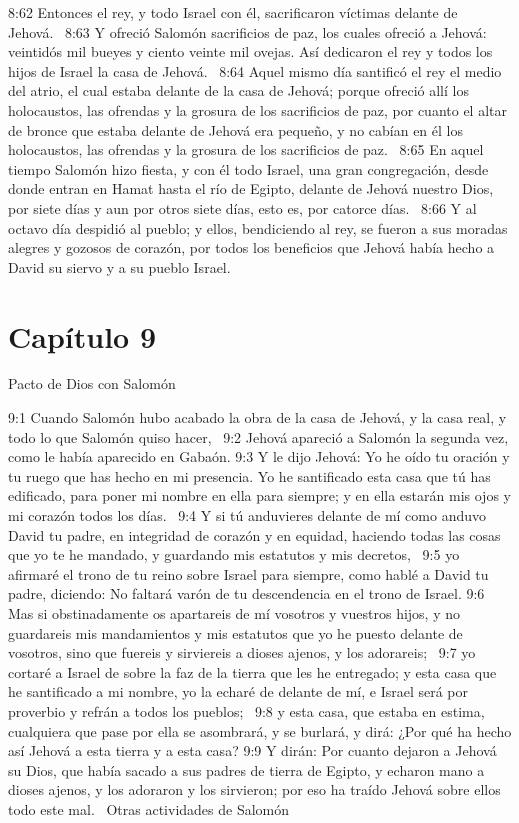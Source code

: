 8:62 Entonces el rey, y todo Israel con él, sacrificaron víctimas delante de Jehová.  
8:63 Y ofreció Salomón sacrificios de paz, los cuales ofreció a Jehová: veintidós mil bueyes y ciento veinte mil ovejas. Así dedicaron el rey y todos los hijos de Israel la casa de Jehová.  
8:64 Aquel mismo día santificó el rey el medio del atrio, el cual estaba delante de la casa de Jehová; porque ofreció allí los holocaustos, las ofrendas y la grosura de los sacrificios de paz, por cuanto el altar de bronce que estaba delante de Jehová era pequeño, y no cabían en él los holocaustos, las ofrendas y la grosura de los sacrificios de paz.  
8:65 En aquel tiempo Salomón hizo fiesta, y con él todo Israel, una gran congregación, desde donde entran en Hamat hasta el río de Egipto, delante de Jehová nuestro Dios, por siete días y aun por otros siete días, esto es, por catorce días.  
8:66 Y al octavo día despidió al pueblo; y ellos, bendiciendo al rey, se fueron a sus moradas alegres y gozosos de corazón, por todos los beneficios que Jehová había hecho a David su siervo y a su pueblo Israel.  
\section*{Capítulo 9 }
Pacto de Dios con Salomón  


9:1 Cuando Salomón hubo acabado la obra de la casa de Jehová, y la casa real, y todo lo que Salomón quiso hacer,  
9:2 Jehová apareció a Salomón la segunda vez, como le había aparecido en Gabaón. 
9:3 Y le dijo Jehová: Yo he oído tu oración y tu ruego que has hecho en mi presencia. Yo he santificado esta casa que tú has edificado, para poner mi nombre en ella para siempre; y en ella estarán mis ojos y mi corazón todos los días.  
9:4 Y si tú anduvieres delante de mí como anduvo David tu padre, en integridad de corazón y en equidad, haciendo todas las cosas que yo te he mandado, y guardando mis estatutos y mis decretos,  
9:5 yo afirmaré el trono de tu reino sobre Israel para siempre, como hablé a David tu padre, diciendo: No faltará varón de tu descendencia en el trono de Israel. 
9:6 Mas si obstinadamente os apartareis de mí vosotros y vuestros hijos, y no guardareis mis mandamientos y mis estatutos que yo he puesto delante de vosotros, sino que fuereis y sirviereis a dioses ajenos, y los adorareis;  
9:7 yo cortaré a Israel de sobre la faz de la tierra que les he entregado; y esta casa que he santificado a mi nombre, yo la echaré de delante de mí, e Israel será por proverbio y refrán a todos los pueblos;  
9:8 y esta casa, que estaba en estima, cualquiera que pase por ella se asombrará, y se burlará, y dirá: ¿Por qué ha hecho así Jehová a esta tierra y a esta casa? 
9:9 Y dirán: Por cuanto dejaron a Jehová su Dios, que había sacado a sus padres de tierra de Egipto, y echaron mano a dioses ajenos, y los adoraron y los sirvieron; por eso ha traído Jehová sobre ellos todo este mal.  
Otras actividades de Salomón  

